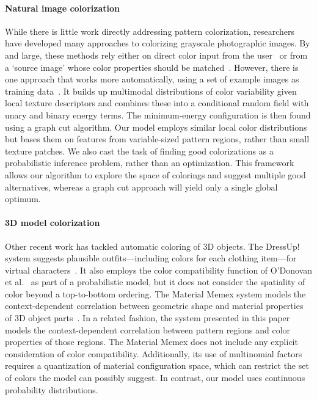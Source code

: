 \paragraph{Natural image colorization}
While there is little work directly addressing pattern colorization, researchers have developed many approaches to colorizing grayscale photographic images. By and large, these methods rely either on direct color input from the user~\cite{ScribbleColorization} or from a `source image' whose color properties should be matched~\cite{TransferColorization}. However, there is one approach that works more automatically, using a set of example images as training data~\cite{MultimodalColorization}. It builds up multimodal distributions of color variability given local texture descriptors and combines these into a conditional random field with unary and binary energy terms. The minimum-energy configuration is then found using a graph cut algorithm. Our model employs similar local color distributions but bases them on features from variable-sized pattern regions, rather than small texture patches. We also cast the task of finding good colorizations as a probabilistic inference problem, rather than an optimization. This framework allows our algorithm to explore the space of colorings and suggest multiple good alternatives, whereas a graph cut approach will yield only a single global optimum.

\paragraph{3D model colorization}
Other recent work has tackled automatic coloring of 3D objects. The DressUp! system suggests plausible outfits---including colors for each clothing item---for virtual characters~\cite{DressUp}. It also employs the color compatibility function of O'Donovan et al.~ as part of a probabilistic model, but it does not consider the spatiality of color beyond a top-to-bottom ordering. The Material Memex system models the context-dependent correlation between geometric shape and material properties of 3D object parts~\cite{MaterialMemex}. In a related fashion, the system presented in this paper models the context-dependent correlation between pattern regions and color properties of those regions. The Material Memex does not include any explicit consideration of color compatibility. Additionally, its use of multinomial factors requires a quantization of material configuration space, which can restrict the set of colors the model can possibly suggest. In contrast, our model uses continuous probability distributions.


